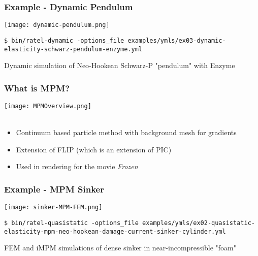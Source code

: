 \documentclass{beamer}
\begin{document}

\begin{frame}[fragile]
\begin{center}
\frametitle{Example - Dynamic Pendulum}

\texttt{[image: dynamic-pendulum.png]}

{\tiny
\begin{lstlisting}
$ bin/ratel-dynamic -options_file examples/ymls/ex03-dynamic-elasticity-schwarz-pendulum-enzyme.yml
\end{lstlisting}
}

Dynamic simulation of Neo-Hookean Schwarz-P "pendulum" with Enzyme

\end{center}
\end{frame}


\begin{frame}
\begin{center}
\frametitle{What is MPM?}

\texttt{[image: MPMOverview.png]}\\

~\\

\begin{itemize}

\item Continuum based particle method with background mesh for gradients\\

\item Extension of FLIP (which is an extension of PIC)\\

\item Used in rendering for the movie \emph{Frozen}\\

\end{itemize}

\end{center}
\end{frame}


\begin{frame}[fragile]
\begin{center}
\frametitle{Example - MPM Sinker}

\texttt{[image: sinker-MPM-FEM.png]}

{\tiny
\begin{lstlisting}
$ bin/ratel-quasistatic -options_file examples/ymls/ex02-quasistatic-elasticity-mpm-neo-hookean-damage-current-sinker-cylinder.yml
\end{lstlisting}
}

FEM and iMPM simulations of dense sinker in near-incompressible "foam"

\end{center}
\end{frame}
\end{document}
